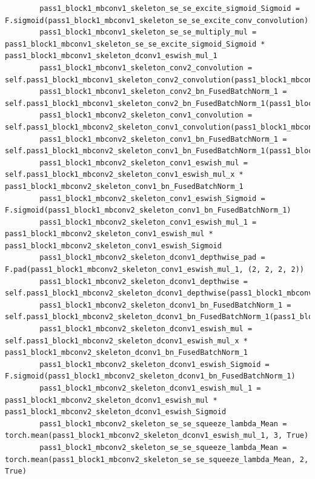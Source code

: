 \documentclass{fisatprojectfinal}
\begin{document}
\begin{appendices}
\begin{lstlisting}
        pass1_block1_mbconv1_skeleton_se_se_excite_sigmoid_Sigmoid = F.sigmoid(pass1_block1_mbconv1_skeleton_se_se_excite_conv_convolution)
        pass1_block1_mbconv1_skeleton_se_se_multiply_mul = pass1_block1_mbconv1_skeleton_se_se_excite_sigmoid_Sigmoid * pass1_block1_mbconv1_skeleton_dconv1_eswish_mul_1
        pass1_block1_mbconv1_skeleton_conv2_convolution = self.pass1_block1_mbconv1_skeleton_conv2_convolution(pass1_block1_mbconv1_skeleton_se_se_multiply_mul)
        pass1_block1_mbconv1_skeleton_conv2_bn_FusedBatchNorm_1 = self.pass1_block1_mbconv1_skeleton_conv2_bn_FusedBatchNorm_1(pass1_block1_mbconv1_skeleton_conv2_convolution)
        pass1_block1_mbconv2_skeleton_conv1_convolution = self.pass1_block1_mbconv2_skeleton_conv1_convolution(pass1_block1_mbconv1_skeleton_conv2_bn_FusedBatchNorm_1)
        pass1_block1_mbconv2_skeleton_conv1_bn_FusedBatchNorm_1 = self.pass1_block1_mbconv2_skeleton_conv1_bn_FusedBatchNorm_1(pass1_block1_mbconv2_skeleton_conv1_convolution)
        pass1_block1_mbconv2_skeleton_conv1_eswish_mul = self.pass1_block1_mbconv2_skeleton_conv1_eswish_mul_x * pass1_block1_mbconv2_skeleton_conv1_bn_FusedBatchNorm_1
        pass1_block1_mbconv2_skeleton_conv1_eswish_Sigmoid = F.sigmoid(pass1_block1_mbconv2_skeleton_conv1_bn_FusedBatchNorm_1)
        pass1_block1_mbconv2_skeleton_conv1_eswish_mul_1 = pass1_block1_mbconv2_skeleton_conv1_eswish_mul * pass1_block1_mbconv2_skeleton_conv1_eswish_Sigmoid
        pass1_block1_mbconv2_skeleton_dconv1_depthwise_pad = F.pad(pass1_block1_mbconv2_skeleton_conv1_eswish_mul_1, (2, 2, 2, 2))
        pass1_block1_mbconv2_skeleton_dconv1_depthwise = self.pass1_block1_mbconv2_skeleton_dconv1_depthwise(pass1_block1_mbconv2_skeleton_dconv1_depthwise_pad)
        pass1_block1_mbconv2_skeleton_dconv1_bn_FusedBatchNorm_1 = self.pass1_block1_mbconv2_skeleton_dconv1_bn_FusedBatchNorm_1(pass1_block1_mbconv2_skeleton_dconv1_depthwise)
        pass1_block1_mbconv2_skeleton_dconv1_eswish_mul = self.pass1_block1_mbconv2_skeleton_dconv1_eswish_mul_x * pass1_block1_mbconv2_skeleton_dconv1_bn_FusedBatchNorm_1
        pass1_block1_mbconv2_skeleton_dconv1_eswish_Sigmoid = F.sigmoid(pass1_block1_mbconv2_skeleton_dconv1_bn_FusedBatchNorm_1)
        pass1_block1_mbconv2_skeleton_dconv1_eswish_mul_1 = pass1_block1_mbconv2_skeleton_dconv1_eswish_mul * pass1_block1_mbconv2_skeleton_dconv1_eswish_Sigmoid
        pass1_block1_mbconv2_skeleton_se_se_squeeze_lambda_Mean = torch.mean(pass1_block1_mbconv2_skeleton_dconv1_eswish_mul_1, 3, True)
        pass1_block1_mbconv2_skeleton_se_se_squeeze_lambda_Mean = torch.mean(pass1_block1_mbconv2_skeleton_se_se_squeeze_lambda_Mean, 2, True)

\end{lstlisting}
\end{appendices}
\end{document}
